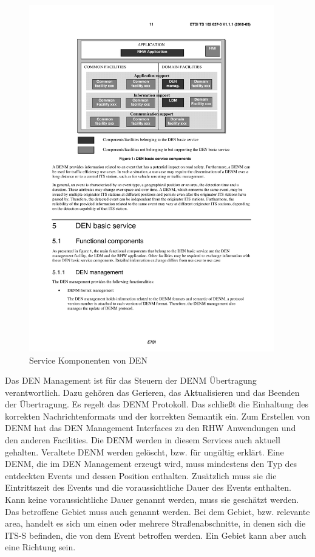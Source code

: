 \begin{figure}[htbp]
	\includegraphics[width=0.95\textwidth]{content/images/04_facilitylayer/denServices.pdf}
	\caption{Service Komponenten von DEN \cite{ts102637-3}}
	\label{fig:darstellungDenServices}
\end{figure}


Das \ac{DEN} Management  ist für das Steuern der \ac{DENM} Übertragung verantwortlich. Dazu gehören das Gerieren, das Aktualisieren und das Beenden der Übertragung. Es regelt das \ac{DENM} Protokoll. Das schließt die Einhaltung des korrekten Nachrichtenformats und der korrekten Semantik ein. Zum Erstellen von \ac{DENM} hat das \ac{DEN} Management Interfaces zu den \ac{RHW} Anwendungen und den anderen Facilities. Die \ac{DENM} werden in diesem Services auch aktuell gehalten. Veraltete \ac{DENM} werden gelöscht, bzw. für ungültig erklärt. Eine \ac{DENM}, die im \ac{DEN} Management erzeugt wird, muss mindestens den Typ des entdeckten Events und dessen Position enthalten. Zusätzlich muss sie die Eintrittszeit des Events und die voraussichtliche Dauer des Events enthalten. Kann keine voraussichtliche Dauer genannt werden, muss sie geschätzt werden. Das betroffene Gebiet muss auch genannt werden. Bei dem Gebiet, bzw. relevante area, handelt es sich um einen oder mehrere Straßenabschnitte, in denen sich die \ac{ITS-S} befinden, die von dem Event betroffen werden. Ein Gebiet kann aber auch eine Richtung sein.

